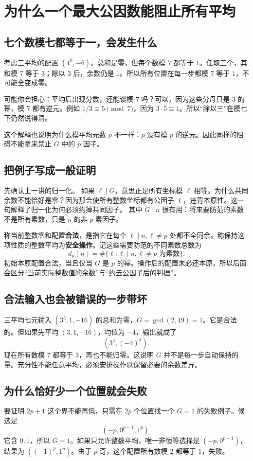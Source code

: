 \chapter{为什么一个最大公因数能阻止所有平均}\label{sec:obstruction}
\section{七个数模七都等于一，会发生什么}
考虑三平均的配置 $(1^6,-6)$。总和是零，但每个数模 $7$ 都等于 $1$。任取三个，其和模 $7$ 等于 $3$；除以 $3$ 后，余数仍是 $1$。所以所有位置在每一步都模 $7$ 等于 $1$，不可能全变成零。

可能你会担心：平均后出现分数，还能谈模 $7$ 吗？可以，因为这些分母只是 $3$ 的幂，模 $7$ 都有逆元。例如 $1/3\equiv5\pmod7$，因为 $3\cdot5\equiv1$。所以“除以三”在模七下仍然说得清。

这个解释也说明为什么模平均元数 $p$ 不一样：$p$ 没有模 $p$ 的逆元。因此同样的阻碍不能拿来禁止 $G$ 中的 $p$ 因子。

\section{把例子写成一般证明}
先确认上一讲的归一化。
如果 $\ell\mid G$，意思正是所有坐标模 $\ell$ 相等。为什么共同余数不能恰好是零？因为那会使所有整数坐标都有公因子 $\ell$，违背本原性。这一句解释了归一化为何必须约掉共同因子。
其中 $G\mid n$ 很有用：将来要防范的素数不是所有素数，只是 $n$ 的非 $p$ 素因子。

称当前整数零和配置\textbf{合法}，是指它在每个 $\ell\mid n,\ell\ne p$ 处都不全同余。称保持这项性质的整数平均为\textbf{安全操作}。记这些需要防范的不同素数总数为
\[d_p(n)=\#\{\ell:\ell\mid n,\ell\ne p\text{ 为素数}\}.
\]
初始本原配置合法，当且仅当 $G$ 是 $p$ 的幂。操作后的配置未必还本原，所以后面会区分“当前实际整数值的余数”与“约去公因子后的判据”。

\section{合法输入也会被错误的一步带坏}
三平均七元输入 $(3^5,1,-16)$ 的总和为零，$G=\gcd(2,19)=1$。它是合法的。但如果先平均 $(3,1,-16)$，均值为 $-4$，输出就成了
\[(3^4,(-4)^3).
\]
现在所有数模 $7$ 都等于 $3$，再也不能归零。这说明 $G$ 并不是每一步自动保持的量。充分性不能任意平均，必须安排操作以保留必要的余数差异。

\section{为什么恰好少一个位置就会失败}
要证明 $2p+1$ 这个界不能再低，只需在 $2p$ 个位置找一个 $G=1$ 的失败例子。候选是
\[(-p,0^{p-1},1^p).
\]
它含 $0,1$，所以 $G=1$。如果只允许整数平均，唯一非恒等选择是 $(-p,0^{p-1})$，结果为 $((-1)^p,1^p)$。由于 $p$ 奇，这个配置所有数模 $2$ 都等于 $1$，失败。

